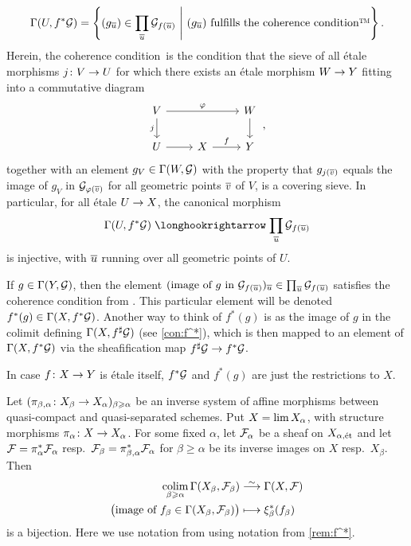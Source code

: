 \begin{rem}
\begin{alphanumerate}
		\begin{equation*}
			\Gamma(U,f^*\Gg)=\left\{(g_{\ov{u}})\in\prod_{\ov{u}}\Gg_{f(\ov{u})}\st(g_{\ov{u}})\text{ fulfills the coherence condition\texttrademark}\right\}.
		\end{equation*}
		Herein, the coherence condition\texttrademark\ is the condition that the sieve of all étale morphisms $j\colon V\morphism U$ for which there exists an étale morphism $W\morphism Y$ fitting into a commutative diagram
		\begin{equation*}
			\begin{tikzcd}
				V\dar["j"']\ar[rr, "\phi"] & & W\dar\\
				U \rar& X\rar["f"] & Y 
			\end{tikzcd}\,,
		\end{equation*}
		together with an element $g_V\in \operatorname{\Gamma}(W,\mathcal{G})$ with the property that $g_{j(\ov{v})}$ equals the image of $g_V$ in $\Gg_{\phi(\ov{v})}$ for all geometric points $\ov{v}$ of $V$, is a covering sieve. In particular, for all étale $U\morphism X$, the canonical morphism
		\begin{equation*}
		\Global(U,f^*\Gg)\monomorphism \prod_{\ov{u}}\Gg_{f(\ov{u})}
		\end{equation*}
		is injective, with $\ov{u}$ running over all geometric points of $U$.
		\item If $g\in\operatorname{\Gamma}(Y,\mathcal{G})$, then the element $(\text{image of $g$ in $\Gg_{f(\ov{u})}$})_{\ov{u}}\in\prod_{\ov{u}}\Gg_{f(\ov{u})}$ satisfies the coherence condition from . This particular element will be denoted $f^*(g)\in \operatorname{\Gamma}(X,f^*\mathcal{G})$. Another way to think of $f^*(g)$ is as the image of $g$ in the colimit defining $\operatorname{\Gamma}(X,f^\sharp\mathcal{G})$ (see \cref{con:f^*}), which is then mapped to an element of $\operatorname{\Gamma}(X,f^*\mathcal{G})$ via the sheafification map $f^\sharp\Gg\morphism f^*\Gg$.
		\item In case $f\colon X\morphism Y$ is étale itself, $f^*\mathcal{G}$ and $f^*(g)$ are just the restrictions to $X$.
	\end{alphanumerate}
\end{rem}
\begin{prop}\label{prop:etaleInverseLimit}
	Let $(\pi_{\beta,\alpha}\colon X_\beta\morphism X_\alpha)_{\beta\geq \alpha}$ be an inverse system of affine morphisms between quasi-compact and quasi-separated schemes. Put $X=\operatorname*{lim} X_\alpha$, with structure morphisms $\pi_\alpha\colon X\morphism X_\alpha$. For some fixed $\alpha$, let $\mathcal{F}_\alpha$ be a sheaf on $X_{\alpha,\mathrm{\acute{e}t}}$ and let $\mathcal{F}=\pi_\alpha^*\mathcal{F}_\alpha$ resp.\ $\mathcal{F}_\beta=\pi_{\beta,\alpha}^*\mathcal{F}_\alpha$ for $\beta\geq \alpha$ be its inverse images on $X$ resp.\ $X_\beta$. Then
	\begin{align*}
		\colimit_{\beta\geq \alpha}\Global(X_\beta,\Ff_\beta)&\isomorphism \Global(X,\Ff)\\
		\big(\text{image of }f_\beta\in\Global(X_\beta,\Ff_\beta)\big)&\longmapsto \xi_\beta^*(f_\beta)
	\end{align*}
	is a bijection. Here we use notation from using notation from \cref{rem:f^*}.
\end{prop}
